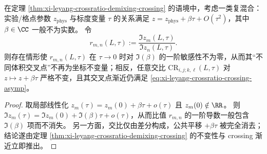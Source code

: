 \begin{corollary}[复混合下比值法可失稳而交比法仍严格不变]\label{cor:xi-leyang-imag-ratio-unstable-crossratio-invariant}
在定理 \ref{thm:xi-leyang-crossratio-demixing-crossing} 的语境中，考虑一类复混合：实验/格点参数 \(z_{\mathrm{phys}}\) 与标度变量 \(\tau\) 的关系满足
\(
z=z_{\mathrm{phys}}+\beta\tau+O(\tau^2)
\)，其中 \(\beta\in\CC\) 一般不为实数。
令
\[
r_{m,n}(L,\tau):=\frac{\Im z_m(L,\tau)}{\Im z_n(L,\tau)}.
\]
则存在情形使 \(r_{m,n}(L,\tau)\) 在 \(\tau\to 0\) 时对 \(\Im(\beta)\) 的一阶敏感性不为零，从而其“不同体积交叉点”不再为坐标不变量；相反，任意交比 \(\mathrm{CR}_{i,j;k,\ell}(L,\tau)\) 对 \(z\mapsto z+\beta\tau\) 严格不变，且其交叉点渐近仍满足 \eqref{eq:xi-leyang-crossratio-crossing-asymp}。
\end{corollary}
\begin{proof}
取局部线性化 \(z_m(\tau)=z_m(0)+\beta\tau+o(\tau)\) 且 \(z_m(0)\notin\RR\)。
则 \(\Im z_m(\tau)=\Im z_m(0)+\Im(\beta)\tau+o(\tau)\)，从而比值 \(r_{m,n}\) 的一阶导数一般包含 \(\Im(\beta)\) 项而不消失。
另一方面，交比仅由差分构成，公共平移 \(+\beta\tau\) 被完全消去；结论遂由定理 \ref{thm:xi-leyang-crossratio-demixing-crossing} 的不变性与 crossing 渐近立即推出。
\end{proof}

